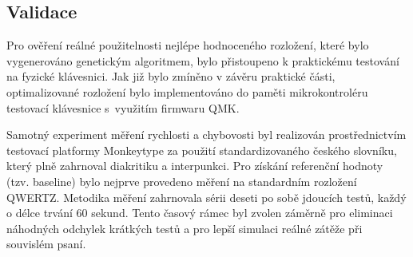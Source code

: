 \documentclass[a4paper, twoside, 12pt, czech]{article}
\begin{document}
\subsection{Validace}


Pro ověření reálné použitelnosti nejlépe hodnoceného rozložení, které bylo 
vygenerováno genetickým algoritmem, bylo přistoupeno k praktickému testování na 
fyzické klávesnici. Jak již bylo zmíněno v závěru praktické části, optimalizované 
rozložení bylo implementováno do paměti mikrokontroléru testovací klávesnice 
s~využitím firmwaru QMK.

Samotný experiment měření rychlosti a chybovosti byl realizován prostřednic\-tvím 
testovací platformy Monkeytype za použití standardizovaného českého slov\-níku, 
který plně zahrnoval diakritiku a interpunkci. Pro získání referenční hodnoty 
(tzv. baseline) bylo nejprve provedeno měření na standardním rozložení QWERTZ. 
Metodika měření zahrnovala sérii deseti po sobě jdoucích testů, každý o délce 
trvání 60 sekund. Tento časový rámec byl zvolen záměrně pro eliminaci náhod\-ných 
odchylek krátkých testů a pro lepší simulaci reálné zátěže při souvislém psaní.
\end{document}
